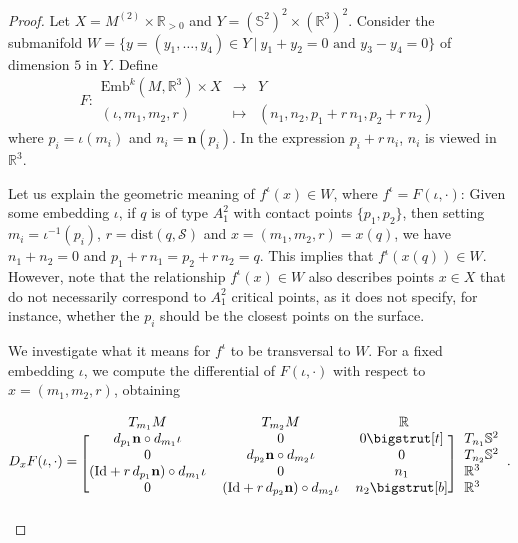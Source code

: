 \documentclass[11pt]{article}
\newcommand{\R}{\mathbb{R}}
\newcommand{\io}{\iota}
\newcommand{\nbf}{\mathbf{n}}
\newcommand{\Emb}{\mathrm{Emb}^k(M,\R^3)}
\newcommand{\dist}{\mathrm{dist}}
\newcommand{\Surf}{\mathcal{S}}
\newcommand{\Id}{\mathrm{Id}}
\newcommand\topstrut[1][1.2ex]{\setlength\bigstrutjot{#1}{\bigstrut[t]}}
\newcommand\botstrut[1][1.2ex]{\setlength\bigstrutjot{#1}{\bigstrut[b]}}
\theoremstyle{plain}
\theoremstyle{definition}
\theoremstyle{remark}
\begin{document}
\begin{proof}
		Let $X = M^{(2)} \times \R_{>0}$ and $Y = (\mathbb{S}^2)^2 \times (\R^3)^2$. Consider the submanifold $W = \{y = (y_1,\ldots, y_4)\in Y ~|~ y_1 + y_2 = 0 \text{ and } y_3 - y_4 = 0 \}$ of dimension $5$ in $Y$.
		Define 
		\begin{equation}
			F:
			\begin{array}{ccc}
				\Emb \times X & \to & Y \\
				(\io, m_1,m_2,r) & \mapsto & (n_1, n_2, p_1 + r \, n_1, p_2 + r \, n_2 )
			\end{array}
		\end{equation}
		where $p_i = \io(m_i)$ and $n_i = \nbf(p_i)$. In the expression $p_i + r \, n_i$, $n_i$ is viewed in $\R^3$.
		
		Let us explain the geometric meaning of $f^\io(x) \in W$, where $f^\io = F(\io,\cdot)$:
		Given some embedding $\io$, if $q$ is of type $A_1^2$ with contact points $\{p_1,p_2\}$, then setting $m_i = \io^{-1}(p_i)$, $r = \dist(q, \Surf)$ and $x = (m_1,m_2,r) = x(q)$, we have $n_1 + n_2 = 0$ and $p_1 + r \, n_1 = p_2 + r \, n_2 = q$. This implies that $f^\io(x(q)) \in W$. However, note that the relationship $f^\io(x) \in W$ also describes points $x \in X$ that do not necessarily correspond to $A_1^2$ critical points, as it does not specify, for instance, whether the $p_i$ should be the closest points on the surface. 
		
		We investigate what it means for $f^\io$ to be transversal to $W$.
		For a fixed embedding $\io$, we compute the differential of $F(\iota, \cdot)$ with respect to $x = (m_1,m_2,r)$, obtaining
		
		\begin{equation*}
			D_x F(\io, \cdot) =
			\begin{blockarray}{*{3}{c} l}
				\begin{block}{cccl}
					T_{m_1} M & T_{m_2} M & ~~\R~~ & \\
				\end{block}
				\begin{block}{[ccc] l}
					d_{p_1} \nbf \circ d_{m_1} \io & 0 & 0  \topstrut  & T_{n_1} \mathbb{S}^2 \\
					0 & d_{p_2} \nbf \circ d_{m_2} \io & 0 & T_{n_2} \mathbb{S}^2   \\
					(\Id + r \, d_{p_1} \nbf) \circ d_{m_1} \io & 0 & n_1 & \R^3 \\
					0 & (\Id + r \, d_{p_2} \nbf) \circ d_{m_2} \io & n_2 \botstrut & \R^3  \\
				\end{block}
			\end{blockarray}.
		\end{equation*}
		

\end{proof}
\end{document}
